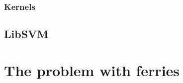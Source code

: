 \documentclass[11pt]{article} %
\begin{document}
% 

% 
% 
% 

\subsubsection{Kernels}
\label{sec:kernels}
% 
% 

\subsection{LibSVM}
\label{sec:libsvm}
% 
% 
%


\section{The problem with ferries}
\label{sec:problem}
% 
\end{document}
